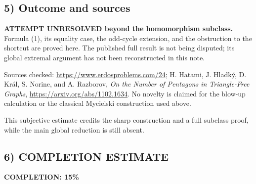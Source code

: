 \subsection*{5) Outcome and sources}
\textbf{ATTEMPT UNRESOLVED beyond the homomorphism subclass.} Formula (1), its equality case, the odd-cycle extension, and the obstruction to the shortcut are proved here. The published full result is not being disputed; its global extremal argument has not been reconstructed in this note.

Sources checked: \url{https://www.erdosproblems.com/24}; H. Hatami, J. Hladk\'y, D. Kr\'al, S. Norine, and A. Razborov, \emph{On the Number of Pentagons in Triangle-Free Graphs}, \url{https://arxiv.org/abs/1102.1634}. No novelty is claimed for the blow-up calculation or the classical Mycielski construction used above.

This subjective estimate credits the sharp construction and a full subclass proof, while the main global reduction is still absent.
\subsection*{6) COMPLETION ESTIMATE}
\textbf{COMPLETION: 15\%}
